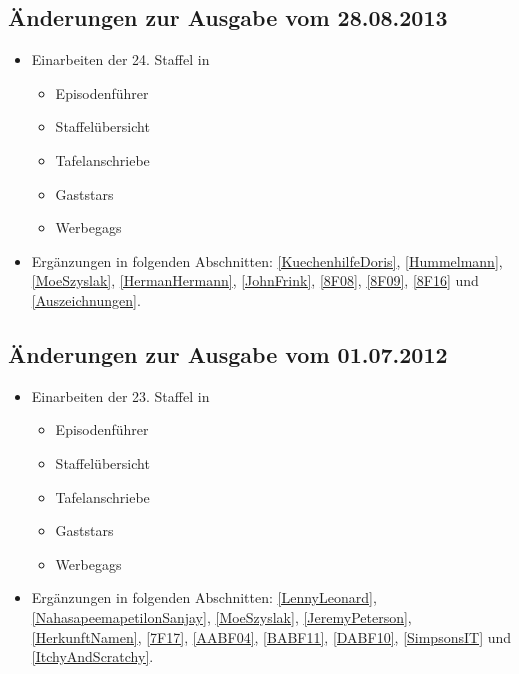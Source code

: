 \documentclass[pagesize,twoside,german]{scrbook}
\begin{document}
\subsection*{Änderungen zur Ausgabe vom 28.08.2013}
\begin{itemize}
	\item Einarbeiten der 24. Staffel in
	\begin{itemize}
		\item Episodenführer
		\item Staffelübersicht
		\item Tafelanschriebe
		\item Gaststars
		\item Werbegags
	\end{itemize}
	\item Ergänzungen in folgenden Abschnitten: \ref{KuechenhilfeDoris}, \ref{Hummelmann}, \ref{MoeSzyslak}, \ref{HermanHermann}, \ref{JohnFrink}, \ref{8F08}, \ref{8F09}, \ref{8F16} und \ref{Auszeichnungen}.
\end{itemize}

\subsection*{Änderungen zur Ausgabe vom 01.07.2012}
\begin{itemize}
\item Einarbeiten der 23. Staffel in
	\begin{itemize}
		\item Episodenführer
		\item Staffelübersicht
		\item Tafelanschriebe
		\item Gaststars
		\item Werbegags
	\end{itemize}
	\item Ergänzungen in folgenden Abschnitten: \ref{LennyLeonard}, \ref{NahasapeemapetilonSanjay}, \ref{MoeSzyslak}, \ref{JeremyPeterson}, \ref{HerkunftNamen}, \ref{7F17}, \ref{AABF04}, \ref{BABF11}, \ref{DABF10}, \ref{SimpsonsIT} und \ref{ItchyAndScratchy}.
\end{itemize}
\end{document}
